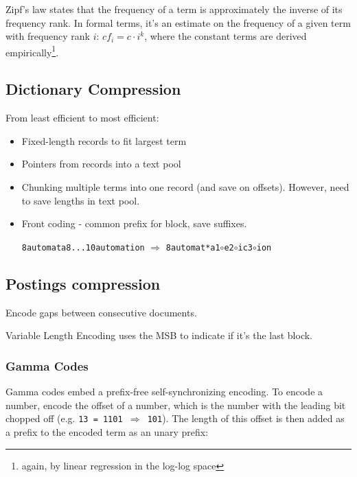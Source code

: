 \documentclass{idc_msc}
\begin{document}
Zipf's law states that the frequency of a term is approximately the inverse of its frequency rank.
In formal terms, it's an estimate on the frequency of a given term with frequency rank \(i\): \({cf}_i = c \cdot i^k\), where the constant terms are derived empirically\footnote{again, by linear regression in the log-log space}.

\subsection{Dictionary Compression}

From least efficient to most efficient:

\begin{itemize}
  \item Fixed-length records to fit largest term
  \item Pointers from records into a text pool
  \item Chunking multiple terms into one record (and save on offsets).
  However, need to save lengths in text pool.
  \item Front coding - common prefix for block, save suffixes.
    \begin{center}
    \texttt{8automata8...10automation} \(\Rightarrow\) \texttt{8automat*a1\(\circ\)e2\(\circ\)ic3\(\circ\)ion}
    \end{center}
\end{itemize}


\subsection{Postings compression}

Encode gaps between consecutive documents.

Variable Length Encoding uses the MSB to indicate if it's the last block.

\subsubsection{Gamma Codes}

Gamma codes embed a prefix-free self-synchronizing encoding.
To encode a number, encode the offset of a number, which is the number with the leading bit chopped off (e.g. \texttt{13 = 1101 \(\Rightarrow\) 101}).
The length of this offset is then added as a prefix to the encoded term as an unary prefix:
\end{document}
